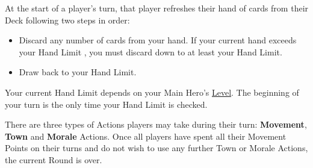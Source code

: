 At the start of a player’s turn, that player refreshes their hand of cards from their Deck following two steps in order:
\begin{itemize}
  \item Discard any number of cards from your hand.
If your current hand exceeds your Hand Limit , you must discard down to at least your Hand Limit.
  \item Draw back to your Hand Limit.
\end{itemize}
Your current Hand Limit depends on your Main Hero’s \hyperlink{Level}{Level}.
The beginning of your turn is the only time your Hand Limit is checked.\par
There are three types of Actions players may take during their turn: \textbf{Movement}, \textbf{Town} and \textbf{Morale} Actions.
Once all players have spent all their Movement Points on their turns and do not wish to use any further Town or Morale Actions, the current Round is over.
